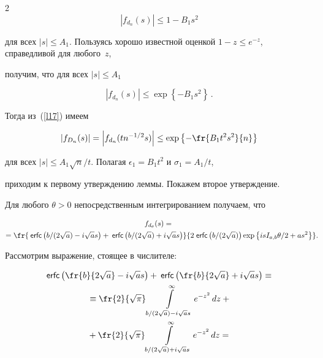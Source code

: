 \begin{multicols}{2}
$$


|f_{d_n}(s)| \leq 1 - B_1 s^2


$$


для всех $|s| \leq A_1$. Пользуясь хорошо известной оценкой $1-z\leq e^{-z}$, справедливой для любого~$z$, 


получим, что для всех $|s| \leq A_1$


$$


|f_{d_n}(s)| \leq \exp\left\{-B_1s^2\right\}\,.


$$


Тогда из~(\ref{l17}) имеем


$$


\left|f_{D_n}(s)\right| = \left|f_{d_n}(tn^{-1/2}s)\right| \leq \exp\left\{-\fr{B_1 t^2 s^2}{n}\right\}


$$


для всех $|s| \leq A_1 \sqrt{n}/t$. Полагая $\epsilon_1 = B_1 t^2$ и $\sigma_1 = A_1/t$, 


приходим к первому утверждению леммы. Покажем второе утверждение.





Для любого $\theta>0$ непосредственным интегрированием получаем, что


\begin{multline*}


f_{d_{\theta}}(s) ={}\\


= \fr{\ercx{{b}/(2\sqrt{a})- i\sqrt{a}s} + 


\ercx{{b}/({2\sqrt{a}}) + i\sqrt{a}s}}{2\;{\sf erfc}\left (b/(2\sqrt{a})\right) \exp\left\{{is\iab \theta}/2 + as^2\right\}}.\hspace*{-7.37994pt}


\end{multline*}


Рассмотрим выражение, стоящее в числителе:


\begin{multline*}


\ercx{\fr{b}{2\sqrt{a}} - i\sqrt{a}s} + \ercx{\fr{b}{2\sqrt{a}} + i\sqrt{a}s} \equiv{}\\


{}


\equiv \fr{2}{\sqrt{\pi}}\int\limits_{{b}/(2\sqrt{a}) - i\sqrt{a}s}^{\infty} e^{-z^2}\,dz +{}\\


{}+


 \fr{2}{\sqrt{\pi}}\int\limits_{{b}/(2\sqrt{a}) + i\sqrt{a}s}^{\infty} e^{-z^2}\,dz ={}\\



\end{multline*}
\end{multicols}
